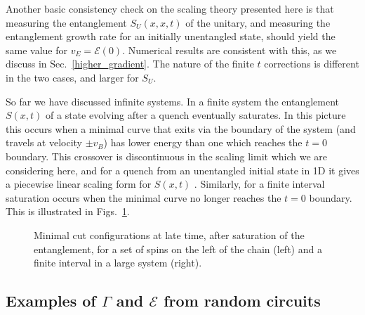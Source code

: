 \documentclass[aps,prx,twocolumn,superscriptaddress,floatfix,nofootinbib,prx]{revtex4}
\renewcommand{\>}{\right\rangle}
\newcommand{\<}{\left\langle}
\newcommand{\lt}{\mathcal{E}}
\begin{document}
Another basic consistency check on the scaling theory presented here is that measuring the entanglement $S_U(x,x,t)$ of the unitary, and measuring the entanglement growth rate for an initially unentangled state, should yield the same value for $v_E=\lt(0)$. Numerical results are consistent with this, as we discuss in Sec.~\ref{higher_gradient}. The nature of the finite $t$ corrections is different in the two cases, and larger for $S_U$. 

So far we have discussed infinite systems. In a finite system the entanglement $S(x,t)$ of a state evolving after a quench eventually saturates.  In this picture this occurs when a  minimal curve that exits via the boundary of the system (and travels at velocity $\pm v_B$) has lower energy than one which reaches the $t=0$ boundary. This crossover is discontinuous in the scaling limit which we are considering here, and for a quench from an unentangled initial state in 1D it gives a piecewise linear scaling form for $S(x,t)$ \cite{nahum}.  Similarly, for a finite interval saturation occurs when the minimal curve no longer reaches the $t=0$ boundary.  This is illustrated in Figs.~\ref{fig:saturation}.

\begin{figure}[b]
\caption{
Minimal cut configurations at late time, after saturation of the entanglement, for a set of spins on the left of the chain (left) and a finite interval in a large system (right).
}  \label{fig:saturation}
\end{figure}

\subsection{Examples of $\Gamma$ and $\lt$ from random circuits}
\label{randomcircuitexamples}
\end{document}
